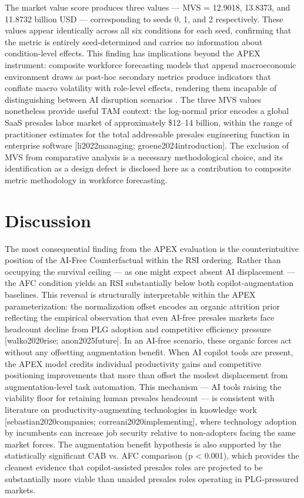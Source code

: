 \documentclass[10pt, conference]{IEEEtran}
\begin{document}
The market value score produces three values --- MVS = 12.9018, 13.8373, and 11.8732 billion USD --- corresponding to seeds 0, 1, and 2 respectively. These values appear identically across all six conditions for each seed, confirming that the metric is entirely seed-determined and carries no information about condition-level effects. This finding has implications beyond the APEX instrument: composite workforce forecasting models that append macroeconomic environment draws as post-hoc secondary metrics produce indicators that conflate macro volatility with role-level effects, rendering them incapable of distinguishing between AI disruption scenarios \cite{virtanen2020scipy}. The three MVS values nonetheless provide useful TAM context: the log-normal prior encodes a global SaaS presales labor market of approximately \$12--14 billion, within the range of practitioner estimates for the total addressable presales engineering function in enterprise software [li2022managing; groene2024introduction]. The exclusion of MVS from comparative analysis is a necessary methodological choice, and its identification as a design defect is disclosed here as a contribution to composite metric methodology in workforce forecasting.

\section{Discussion}

\label{sec:discussion}

The most consequential finding from the APEX evaluation is the counterintuitive position of the AI-Free Counterfactual within the RSI ordering. Rather than occupying the survival ceiling --- as one might expect absent AI displacement --- the AFC condition yields an RSI substantially below both copilot-augmentation baselines. This reversal is structurally interpretable within the APEX parameterization: the normalization offset encodes an organic attrition prior reflecting the empirical observation that even AI-free presales markets face headcount decline from PLG adoption and competitive efficiency pressure [walko2020rise; anon2025future]. In an AI-free scenario, these organic forces act without any offsetting augmentation benefit. When AI copilot tools are present, the APEX model credits individual productivity gains and competitive positioning improvements that more than offset the modest displacement from augmentation-level task automation. This mechanism --- AI tools raising the viability floor for retaining human presales headcount --- is consistent with literature on productivity-augmenting technologies in knowledge work [sebastian2020companies; correani2020implementing], where technology adoption by incumbents can increase job security relative to non-adopters facing the same market forces. The augmentation benefit hypothesis is also supported by the statistically significant CAB vs. AFC comparison (p < 0.001), which provides the cleanest evidence that copilot-assisted presales roles are projected to be substantially more viable than unaided presales roles operating in PLG-pressured markets.
\end{document}
